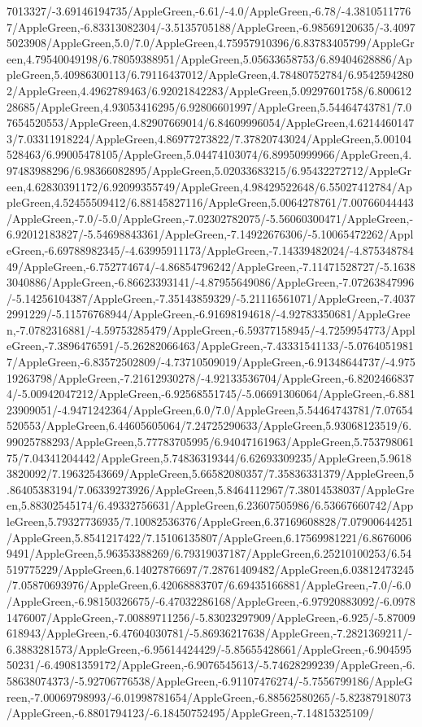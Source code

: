 {\begin{tikzternal}
7013327/-3.69146194735/AppleGreen,-6.61/-4.0/AppleGreen,-6.78/-4.38105117767/AppleGreen,-6.83313082304/-3.5135705188/AppleGreen,-6.98569120635/-3.40975023908/AppleGreen,5.0/7.0/AppleGreen,4.75957910396/6.83783405799/AppleGreen,4.79540049198/6.78059388951/AppleGreen,5.05633658753/6.89404628886/AppleGreen,5.40986300113/6.79116437012/AppleGreen,4.78480752784/6.95425942802/AppleGreen,4.4962789463/6.92021842283/AppleGreen,5.09297601758/6.80061228685/AppleGreen,4.93053416295/6.92806601997/AppleGreen,5.54464743781/7.07654520553/AppleGreen,4.82907669014/6.84609996054/AppleGreen,4.62144601473/7.03311918224/AppleGreen,4.86977273822/7.37820743024/AppleGreen,5.00104528463/6.99005478105/AppleGreen,5.04474103074/6.89950999966/AppleGreen,4.97483988296/6.98366082895/AppleGreen,5.02033683215/6.95432272712/AppleGreen,4.62830391172/6.92099355749/AppleGreen,4.98429522648/6.55027412784/AppleGreen,4.52455509412/6.88145827116/AppleGreen,5.0064278761/7.00766044443/AppleGreen,-7.0/-5.0/AppleGreen,-7.02302782075/-5.56060300471/AppleGreen,-6.92012183827/-5.54698843361/AppleGreen,-7.14922676306/-5.10065472262/AppleGreen,-6.69788982345/-4.63995911173/AppleGreen,-7.14339482024/-4.87534878449/AppleGreen,-6.752774674/-4.86854796242/AppleGreen,-7.11471528727/-5.16383040886/AppleGreen,-6.86623393141/-4.87955649086/AppleGreen,-7.07263847996/-5.14256104387/AppleGreen,-7.35143859329/-5.21116561071/AppleGreen,-7.40372991229/-5.11576768944/AppleGreen,-6.91698194618/-4.92783350681/AppleGreen,-7.0782316881/-4.59753285479/AppleGreen,-6.59377158945/-4.7259954773/AppleGreen,-7.3896476591/-5.26282066463/AppleGreen,-7.43331541133/-5.07640519817/AppleGreen,-6.83572502809/-4.73710509019/AppleGreen,-6.91348644737/-4.97519263798/AppleGreen,-7.21612930278/-4.92133536704/AppleGreen,-6.82024668374/-5.00942047212/AppleGreen,-6.92568551745/-5.06691306064/AppleGreen,-6.88123909051/-4.9471242364/AppleGreen,6.0/7.0/AppleGreen,5.54464743781/7.07654520553/AppleGreen,6.44605605064/7.24725290633/AppleGreen,5.93068123519/6.99025788293/AppleGreen,5.77783705995/6.94047161963/AppleGreen,5.75379806175/7.04341204442/AppleGreen,5.74836319344/6.62693309235/AppleGreen,5.96183820092/7.19632543669/AppleGreen,5.66582080357/7.35836331379/AppleGreen,5.86405383194/7.06339273926/AppleGreen,5.8464112967/7.38014538037/AppleGreen,5.88302545174/6.49332756631/AppleGreen,6.23607505986/6.53667660742/AppleGreen,5.79327736935/7.10082536376/AppleGreen,6.37169608828/7.07900644251/AppleGreen,5.8541217422/7.15106135807/AppleGreen,6.17569981221/6.86760069491/AppleGreen,5.96353388269/6.79319037187/AppleGreen,6.25210100253/6.54519775229/AppleGreen,6.14027876697/7.28761409482/AppleGreen,6.03812473245/7.05870693976/AppleGreen,6.42068883707/6.69435166881/AppleGreen,-7.0/-6.0/AppleGreen,-6.98150326675/-6.47032286168/AppleGreen,-6.97920883092/-6.09781476007/AppleGreen,-7.00889711256/-5.83023297909/AppleGreen,-6.925/-5.87009618943/AppleGreen,-6.47604030781/-5.86936217638/AppleGreen,-7.2821369211/-6.3883281573/AppleGreen,-6.95614424429/-5.85655428661/AppleGreen,-6.90459550231/-6.49081359172/AppleGreen,-6.9076545613/-5.74628299239/AppleGreen,-6.58638074373/-5.92706776538/AppleGreen,-6.91107476274/-5.7556799186/AppleGreen,-7.00069798993/-6.01998781654/AppleGreen,-6.88562580265/-5.82387918073/AppleGreen,-6.8801794123/-6.18450752495/AppleGreen,-7.14815325109/
\end{tikzternal}}
